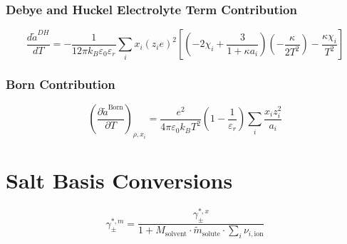\documentclass[12pt, letterpaper]{article}
\begin{document}
\subsubsection{Debye and Huckel Electrolyte Term Contribution}


\begin{equation}
    \frac{d \tilde{a}^{D H}}{d T}=-\frac{1}{12 \pi k_{B} \varepsilon_{0} \varepsilon_{r}} \sum_{i} x_{i}\left(z_{i} e\right)^2\left[\left(-2 \chi_{i}+\frac{3}{1+\kappa a_{i}}\right)\left(-\frac{\kappa}{2 T^2}\right)-\frac{\kappa \chi_{i}}{T^2}\right]
    \label{eq:dares_dh_dT}
\end{equation}

\subsubsection{Born Contribution}


\begin{equation}
    \left(\frac{\partial\tilde{a}^{\mathrm{Born}}}{\partial T}\right)_{\rho,x_{i}}=\frac{e^2}{4 \pi \varepsilon_{0} k_{B} T^2}\left(1-\frac{1}{\varepsilon_{r}}\right) \sum_{i} \frac{x_{i} z_{i}^2}{a_{i}}
    \label{eq:dares_born_dT}
\end{equation}

\section{Salt Basis Conversions}


\begin{equation}
    \gamma_{\pm}^{*,m}=\frac{\gamma_{\pm}^{*,x}}{1+M_{\mathrm{solvent}}\cdot\tilde{m}_{\mathrm{solute}}\cdot\sum_{i}\nu_{i,\mathrm{ion}}}
    \label{eq:gamma_pm_molality}
\end{equation}



\printbibliography
\end{document}
